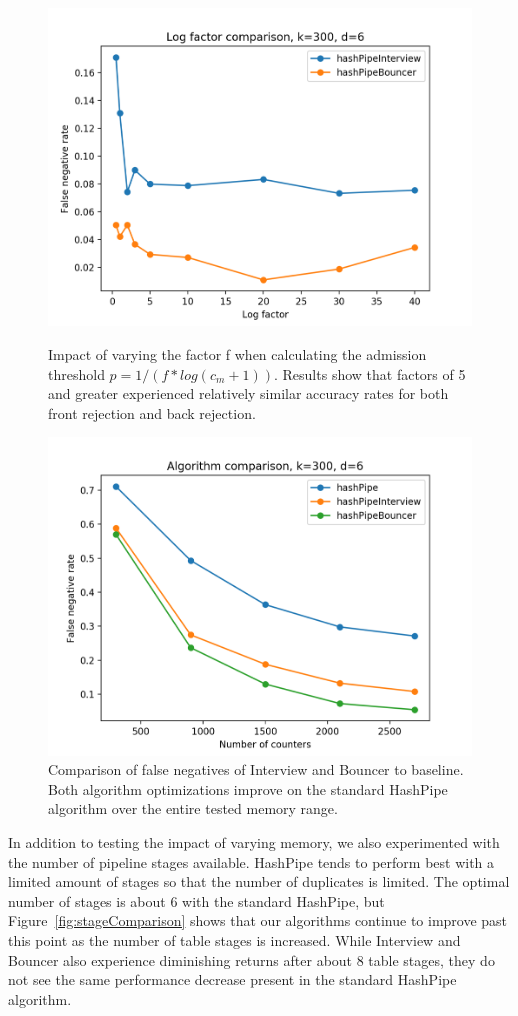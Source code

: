 \begin{figure}[!htb]
  \centering
	\includegraphics[scale=0.5]{log}
     \caption{Impact of varying the factor f when calculating the admission threshold $p = 1 / (f*log(c_m + 1))$. Results show that factors of 5 and greater experienced relatively similar accuracy rates for both front rejection and back rejection.}
     \label{fig:log}
    \includegraphics[scale=0.5]{falsenegatives}
     \caption{Comparison of false negatives of Interview and Bouncer to baseline. Both algorithm optimizations improve on the standard HashPipe algorithm over the entire tested memory range.}
     \label{fig:falsenegatives}
\end{figure}
In addition to testing the impact of varying memory, we also experimented with the number of pipeline stages available. HashPipe tends to perform best with a limited amount of stages so that the number of duplicates is limited. The optimal number of stages is about 6 with the standard HashPipe, but Figure~\ref{fig:stageComparison} shows that our algorithms continue to improve past this point as the number of table stages is increased. While Interview and Bouncer also experience diminishing returns after about 8 table stages, they do not see the same performance decrease present in the standard HashPipe algorithm.
